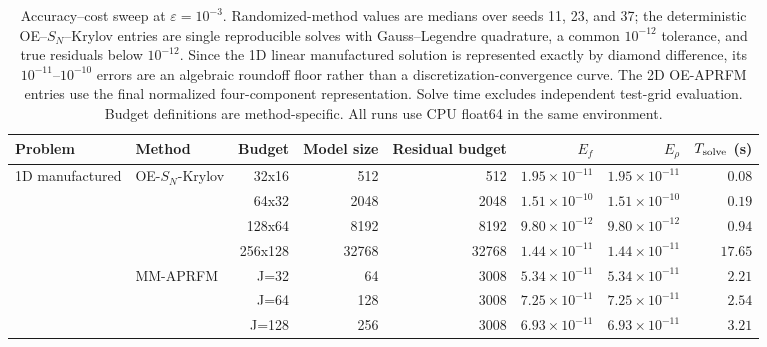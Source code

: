 \begin{table}[t]
\centering
\caption{Accuracy--cost sweep at $\varepsilon=10^{-3}$. Randomized-method values are medians over seeds 11, 23, and 37; the deterministic OE--$S_N$--Krylov entries are single reproducible solves with Gauss--Legendre quadrature, a common $10^{-12}$ tolerance, and true residuals below $10^{-12}$. Since the 1D linear manufactured solution is represented exactly by diamond difference, its $10^{-11}$--$10^{-10}$ errors are an algebraic roundoff floor rather than a discretization-convergence curve. The 2D OE-APRFM entries use the final normalized four-component representation. Solve time excludes independent test-grid evaluation. Budget definitions are method-specific. All runs use CPU float64 in the same environment.}
\label{tab:supp-efficiency}
\begin{tabular}{llrrrrrr}
\toprule
Problem & Method & Budget & Model size & Residual budget & $E_f$ & $E_\rho$ & $T_{\rm solve}$ (s)\\
\midrule
1D manufactured & OE-$S_N$-Krylov & 32x16 & 512 & 512 & $1.95\times10^{-11}$ & $1.95\times10^{-11}$ & $0.08$\\
 &  & 64x32 & 2048 & 2048 & $1.51\times10^{-10}$ & $1.51\times10^{-10}$ & $0.19$\\
 &  & 128x64 & 8192 & 8192 & $9.80\times10^{-12}$ & $9.80\times10^{-12}$ & $0.94$\\
 &  & 256x128 & 32768 & 32768 & $1.44\times10^{-11}$ & $1.44\times10^{-11}$ & $17.65$\\
 & MM-APRFM & J=32 & 64 & 3008 & $5.34\times10^{-11}$ & $5.34\times10^{-11}$ & $2.21$\\
 &  & J=64 & 128 & 3008 & $7.25\times10^{-11}$ & $7.25\times10^{-11}$ & $2.54$\\
 &  & J=128 & 256 & 3008 & $6.93\times10^{-11}$ & $6.93\times10^{-11}$ & $3.21$\\

\end{tabular}
\end{table}
